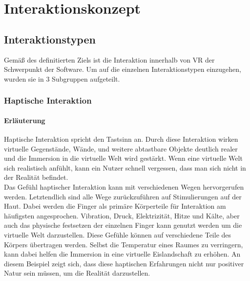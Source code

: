 \chapter{Interaktionskonzept}





\section{Interaktionstypen}
Gemäß des definitierten Ziels ist die Interaktion innerhalb von VR der Schwerpunkt der Software. Um auf die einzelnen Interaktionstypen einzugehen, wurden sie in 3 Subgruppen aufgeteilt.

\subsection{Haptische Interaktion}

\subsubsection{Erläuterung}
Haptische Interaktion spricht den Tastsinn an. Durch diese Interaktion wirken virtuelle Gegenstände, Wände, und weitere abtastbare Objekte deutlich realer und die Immersion in die virtuelle Welt wird gestärkt. Wenn eine virtuelle Welt sich realistisch anfühlt, kann ein Nutzer schnell vergessen, dass man sich nicht in der Realität befindet.\\

Das Gefühl haptischer Interaktion kann mit verschiedenen Wegen hervorgerufen werden. Letztendlich sind alle Wege zurückzuführen auf Stimulierungen auf der Haut. Dabei werden die Finger als primäre Körperteile für Interaktion am häufigsten angesprochen. Vibration, Druck, Elektrizität, Hitze und Kälte, aber auch das physische festsetzen der einzelnen Finger kann genutzt werden um die virtuelle Welt darzustellen. Diese Gefühle können auf verschiedene Teile des Körpers übertragen werden. Selbst die Temperatur eines Raumes zu verringern, kann dabei helfen die Immersion in eine virtuelle Eislandschaft zu erhöhen. An diesem Beispiel zeigt sich, dass diese haptischen Erfahrungen nicht nur positiver Natur sein müssen, um die Realität darzustellen.


